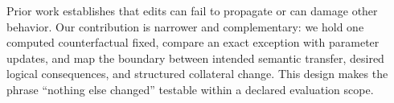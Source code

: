 Prior work establishes that edits can fail to propagate or can damage other behavior. Our contribution is narrower and complementary: we hold one computed counterfactual fixed, compare an exact exception with parameter updates, and map the boundary between intended semantic transfer, desired logical consequences, and structured collateral change. This design makes the phrase ``nothing else changed'' testable within a declared evaluation scope.
